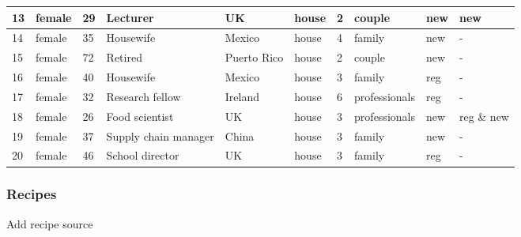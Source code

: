 \documentclass[]{article}
\begin{document}
\begin{table}
\begin{tabular}[t]{l|l|l|l|l|l|l|l|l|l}
\hline
\rowcolor{gray!6}  13 & female & 29 & Lecturer & UK & house & 2 & couple & new & new\\
\hline
14 & female & 35 & Housewife & Mexico & house & 4 & family & new & -\\
\hline
\rowcolor{gray!6}  15 & female & 72 & Retired & Puerto Rico & house & 2 & couple & new & -\\
\hline
16 & female & 40 & Housewife & Mexico & house & 3 & family & reg & -\\
\hline
\rowcolor{gray!6}  17 & female & 32 & Research fellow & Ireland & house & 6 & professionals & reg & -\\
\hline
18 & female & 26 & Food scientist & UK & house & 3 & professionals & new & reg \& new\\
\hline
\rowcolor{gray!6}  19 & female & 37 & Supply chain manager & China & house & 3 & family & new & -\\
\hline
20 & female & 46 & School director & UK & house & 3 & family & reg & -\\
\hline
\end{tabular}
\end{table}

\subsubsection{Recipes}\label{recipes}

Add recipe source
\end{document}
